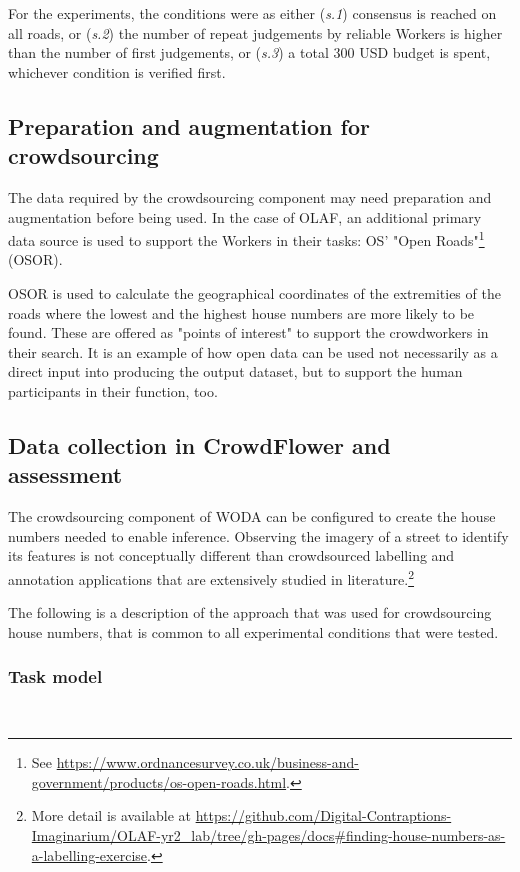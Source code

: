 For the experiments, the conditions were as either ({\it s.1}) consensus is reached on all roads, or ({\it s.2}) the number of repeat judgements by reliable Workers is higher than the number of first judgements, or ({\it s.3}) a total 300 USD budget is spent, whichever condition is verified first.

\subsection{Preparation and augmentation for crowdsourcing} 

The data required by the crowdsourcing component may need preparation and augmentation before being used. In the case of OLAF, an additional primary data source is used to support the Workers in their tasks: OS' "Open Roads"\footnote{See \url{https://www.ordnancesurvey.co.uk/business-and-government/products/os-open-roads.html}.} (OSOR). 

OSOR is used to calculate the geographical coordinates of the extremities of the roads where the lowest and the highest house numbers are more likely to be found. These are offered as "points of interest" to support the crowdworkers in their search. It is an example of how open data can be used not necessarily as a direct input into producing the output dataset, but to support the human participants in their function, too.

\subsection{Data collection in CrowdFlower and assessment}

The crowdsourcing component of WODA can be configured to create the house numbers needed to enable inference. Observing the imagery of a street to identify its features is not conceptually different than crowdsourced labelling and annotation applications that are extensively studied in literature.\footnote{More detail is available at \url{https://github.com/Digital-Contraptions-Imaginarium/OLAF-yr2_lab/tree/gh-pages/docs#finding-house-numbers-as-a-labelling-exercise}.}

The following is a description of the approach that was used for crowdsourcing house numbers, that is common to all experimental conditions that were tested.

\subsubsection{Task model} \leavevmode \\ %

